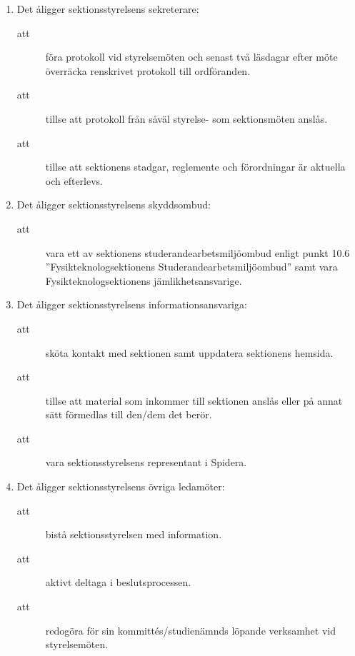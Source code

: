 \documentclass[11pt,a4paper]{article}
\begin{document}
\begin{enumerate}[\thesubsection .1]
  \item Det åligger sektionsstyrelsens sekreterare:
    \begin{description}
      \item[att] föra protokoll vid styrelsemöten och senast två läsdagar efter möte överräcka renskrivet protokoll till ordföranden.
      \item[att] tillse att protokoll från såväl styrelse- som sektionsmöten anslås.
      \item[att] tillse att sektionens stadgar, reglemente och förordningar är aktuella och efterlevs.
    \end{description}

  \item Det åligger sektionsstyrelsens skyddsombud:
    \begin{description}
      \item[att] vara ett av sektionens studerandearbetsmiljöombud
      enligt punkt 10.6 ''Fysikteknologsektionens Studerandearbetsmiljöombud'' samt vara Fys\-ik\-teknolog\-sektionens jämlikhetsansvarige.
    \end{description}
    
  \item Det åligger sektionsstyrelsens informationsansvariga:  
    \begin{description}
      \item[att] sköta kontakt med sektionen samt uppdatera sektionens hemsida. 
      \item[att] tillse att material som inkommer till sektionen anslås eller på annat sätt förmedlas  till den/dem det berör.
      \item[att] vara sektionsstyrelsens representant i Spidera.
    \end{description}    

  \item Det åligger sektionsstyrelsens  övriga ledamöter:
    \begin{description}
      \item[att] bistå sektionsstyrelsen med information.
      \item[att] aktivt deltaga i beslutsprocessen.
      \item[att] redogöra för sin kommittés/studienämnds löpande verksamhet vid styrel\-se\-möten.
      
    \end{description}
\end{enumerate}


\newpage
\end{document}
